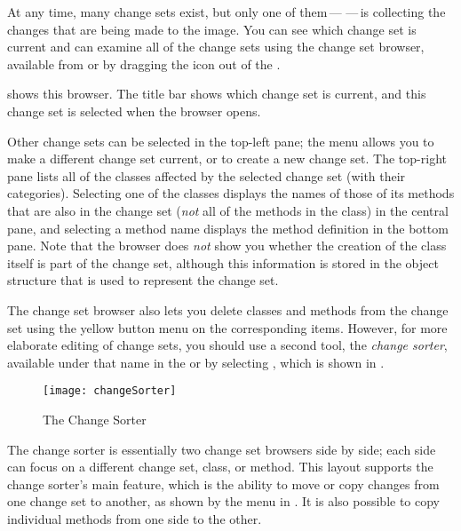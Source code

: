 \documentclass[a4paper,10pt,twoside]{book}
\begin{document}
At any time, many change sets exist, but only one of them\,---\,\,---\,is collecting the changes that are being made to the image.  
You can see which change set is current and can examine all of the change sets using the  change set browser, available from  or by dragging the  icon out of the \toolsflapind.

 shows this browser.  The title bar shows which change set is current, and this change set is selected when the  browser opens. 

Other change sets can be selected in the top-left pane; the  menu allows you to make a different change set current, or to create a new change set.
The top-right pane lists all of the classes affected by the selected change set (with their categories).
Selecting one of the classes displays the names of those of its methods that are also in the change set (\emph{not} all of the methods in the class) in the central pane, and selecting a method name displays the method definition in the bottom pane.
Note that the browser does \emph{not} show you whether the creation of the class itself is part of the change set, although this information is stored in the object structure that is used to represent the change set.

The change set browser also lets you delete classes and methods from the change set using the yellow button menu on the corresponding items.  However, for more elaborate editing of change sets, you should use a second tool, the \textit{change sorter}, available under that name in the \toolsflap or by selecting , which is shown in .

\begin{figure}[btp]
	\begin{center}
		\texttt{[image: changeSorter]}
	\end{center}
	\caption{The Change Sorter}
	\label{fig:changeSorter}
\end{figure}

The change sorter is essentially two change set browsers side by side; each side can focus on a different change set, class, or method.
This layout supports the change sorter's main feature, which is the ability to move or copy changes from one change set to another, as shown by the  menu in .
It is also possible to copy individual methods from one side to the other.
\end{document}
